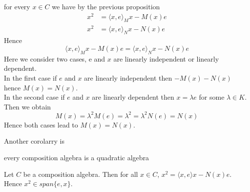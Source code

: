 \documentclass[../Thesis.tex]{subfiles}
\begin{document}
\begin{myproof}
for every $x \in C$ we have by the previous proposition
\begin{align*}
x^2 &= \langle x,e \rangle_M x - M(x)e\\
x^2 &= \langle x,e \rangle_N x - N(x)e
\end{align*}
Hence 
\begin{equation}
\langle x,e \rangle_M x - M(x)e= \langle x,e \rangle_N x - N(x)e
\end{equation}
Here we consider two cases, e and $x$ are linearly independent or linearly dependent.
\\In the first case if $e$ and $x$ are linearly independent then $-M(x) -N(x)$ hence $M(x) = N(x)$.
\\In the second case if $e$ and $x$ are linearly dependent then $x = \lambda e$ for some $\lambda \in K$. Then we obtain
\begin{equation*}
M(x) = \lambda^2M(e) = \lambda^2 = \lambda^2N(e) = N(x)
\end{equation*}
Hence both cases lead to $M(x) = N(x)$.
\end{myproof}
Another corolarry is
\begin{Cor} every composition algebra is a quadratic algebra
\end{Cor}
\begin{myproof}
Let $C$ be a composition algebra. Then for all $x \in C$, $x^2 = \langle x, e \rangle x - N(x)e$. Hence $x^2 \in span\{e, x\}$.
\end{myproof}
\end{document}
